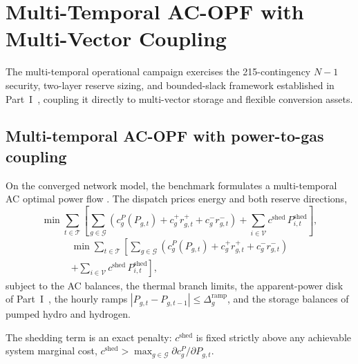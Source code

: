 \section{Multi-Temporal AC-OPF with Multi-Vector Coupling}
\label{sec:opf}

The multi-temporal operational campaign exercises the 215-contingency $N-1$ security, two-layer reserve sizing, and bounded-slack framework established in Part~I~\cite{seni142part1}, coupling it directly to multi-vector storage and flexible conversion assets.


\subsection{Multi-temporal AC-OPF with power-to-gas coupling}
\label{sub:opf}

On the converged network model, the benchmark formulates a multi-temporal AC optimal power flow \cite{molzahn2019}. The dispatch prices energy and both reserve directions,
\ifCLASSOPTIONonecolumn
\begin{equation}
\min \sum_{t \in \mathcal{T}} \left[ \sum_{g \in \mathcal{G}} \left( c_g^{P}(P_{g,t}) + c_g^{+} r_{g,t}^{+} + c_g^{-} r_{g,t}^{-} \right) + \sum_{i \in \mathcal{V}} c^{\mathrm{shed}}\, P_{i,t}^{\mathrm{shed}} \right],
\label{eq:opfobj}
\end{equation}
\else
\begin{multline}
\min \sum_{t \in \mathcal{T}} \left[ \sum_{g \in \mathcal{G}} \left( c_g^{P}(P_{g,t}) + c_g^{+} r_{g,t}^{+} + c_g^{-} r_{g,t}^{-} \right) \right. \\
\left. + \sum_{i \in \mathcal{V}} c^{\mathrm{shed}}\, P_{i,t}^{\mathrm{shed}} \right],
\label{eq:opfobj}
\end{multline}
\fi
subject to the AC balances, the thermal branch limits, the apparent-power disk of Part~I~\cite{seni142part1}, the hourly ramps $|P_{g,t} - P_{g,t-1}| \le \Delta_g^{\mathrm{ramp}}$, and the storage balances of pumped hydro and hydrogen.

The shedding term is an exact penalty: $c^{\mathrm{shed}}$ is fixed strictly above any achievable system marginal cost, $c^{\mathrm{shed}} > \max_{g \in \mathcal{G}} \partial c_g^{P} / \partial P_{g,t}$.

